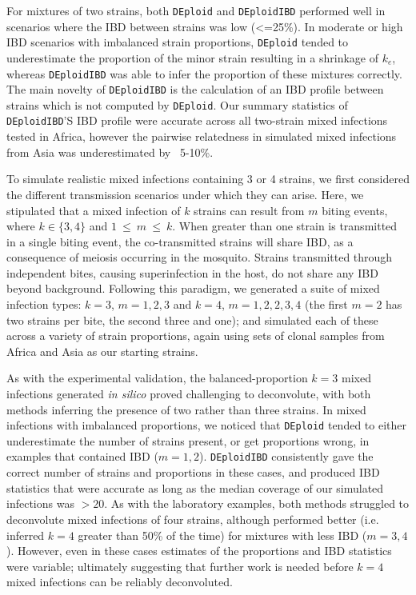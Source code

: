 \documentclass[9pt,lineno]{elife}
\begin{document}
For mixtures of two strains, both \texttt{DEploid} and \texttt{DEploidIBD} performed well in scenarios where the IBD between strains was low (<=25\%). In moderate or high IBD scenarios with imbalanced strain proportions, \texttt{DEploid} tended to underestimate the proportion of the minor strain resulting in a shrinkage of $k_e$, whereas \texttt{DEploidIBD} was able to infer the proportion of these mixtures correctly.  The main novelty of \texttt{DEploidIBD} is the calculation of an IBD profile between strains which is not computed by \texttt{DEploid}. Our summary statistics of \texttt{DEploidIBD}'S IBD profile were accurate across all two-strain mixed infections tested in Africa, however the pairwise relatedness in simulated mixed infections from Asia was underestimated by ~5-10\%.

To simulate realistic mixed infections containing 3 or 4 strains, we first considered the different transmission scenarios under which they can arise.  Here, we stipulated that a mixed infection of $k$ strains can result from $m$ biting events, where $k \in \{3,4\}$ and $1~{\leq}~{m}~{\leq}~k$. When greater than one strain is transmitted in a single biting event, the co-transmitted strains will share IBD, as a consequence of meiosis occurring in the mosquito. Strains transmitted through independent bites, causing superinfection in the host, do not share any IBD beyond background. Following this paradigm, we generated a suite of mixed infection types: $k=3$, $m=1, 2, 3$ and $k=4$, $m=1, 2, 2, 3, 4$ (the first $m=2$ has two strains per bite, the second three and one); and simulated each of these across a variety of strain proportions, again using sets of clonal samples from Africa and Asia as our starting strains.

As with the experimental validation, the balanced-proportion $k=3$ mixed infections generated {\it in silico} proved challenging to deconvolute, with both methods inferring the presence of two rather than three strains. In mixed infections with imbalanced proportions, we noticed that \texttt{DEploid} tended to either underestimate the number of strains present, or get proportions wrong, in examples that contained IBD ($m=1, 2$). \texttt{DEploidIBD} consistently gave the correct number of strains and proportions in these cases, and produced IBD statistics that were accurate as long as the median coverage of our simulated infections was $>20$. As with the laboratory examples, both methods struggled to deconvolute mixed infections of four strains, although performed better (i.e. inferred $k=4$ greater than 50\% of the time) for mixtures with less IBD ($m=3, 4$). However, even in these cases estimates of the proportions and IBD statistics were variable; ultimately suggesting that further work is needed before $k=4$ mixed infections can be reliably deconvoluted.
\end{document}
